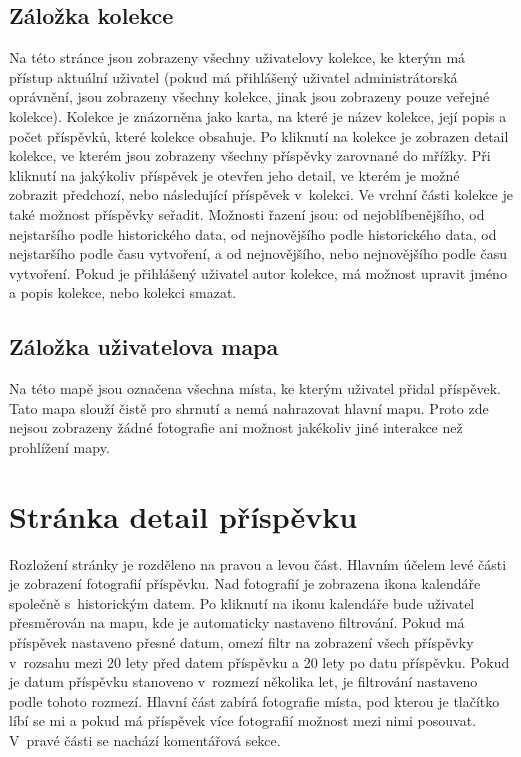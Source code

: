 \documentclass[12pt, a4paper,
  oneside,      %
]{report}
\begin{document}
\subsection{Záložka kolekce}
Na této stránce jsou zobrazeny všechny uživatelovy kolekce, ke kterým má přístup aktuální uživatel (pokud má přihlášený uživatel administrátorská oprávnění, jsou zobrazeny všechny kolekce, jinak jsou zobrazeny pouze veřejné kolekce). Kolekce je znázorněna jako karta, na které je název kolekce, její popis a počet příspěvků, které kolekce obsahuje. Po kliknutí na kolekce je zobrazen detail kolekce, ve kterém jsou zobrazeny všechny příspěvky zarovnané do mřížky. Při kliknutí na jakýkoliv příspěvek je otevřen jeho detail, ve kterém je možné zobrazit předchozí, nebo následující příspěvek v~kolekci. Ve vrchní části kolekce je také možnost příspěvky seřadit. Možnosti řazení jsou: od nejoblíbenějšího, od nejstaršího podle historického data, od nejnovějšího podle historického data, od nejstaršího podle času vytvoření, a od nejnovějšího, nebo nejnovějšího podle času vytvoření. Pokud je přihlášený uživatel autor kolekce, má možnost upravit jméno a popis kolekce, nebo kolekci smazat.
\subsection{Záložka uživatelova mapa}
Na této mapě jsou označena všechna místa, ke kterým uživatel přidal příspěvek. Tato mapa slouží čistě pro shrnutí a nemá nahrazovat hlavní mapu. Proto zde nejsou zobrazeny žádné fotografie ani možnost jakékoliv jiné interakce než prohlížení mapy.

\section{Stránka detail příspěvku}
Rozložení stránky je rozděleno na pravou a levou část. Hlavním účelem levé části je zobrazení fotografií příspěvku. Nad fotografií je zobrazena ikona kalendáře společně s~historickým datem. Po kliknutí na ikonu kalendáře bude uživatel přesměrován na mapu, kde je automaticky nastaveno filtrování. Pokud má příspěvek nastaveno přesné datum, omezí filtr na zobrazení všech příspěvky v~rozsahu mezi 20 lety před datem příspěvku a 20 lety po datu příspěvku. Pokud je datum příspěvku stanoveno v~rozmezí několika let, je filtrování nastaveno podle tohoto rozmezí. Hlavní část zabírá fotografie místa, pod kterou je tlačítko líbí se mi a pokud má příspěvek více fotografií možnost mezi nimi posouvat. V~pravé části se nachází komentářová sekce.
\end{document}

